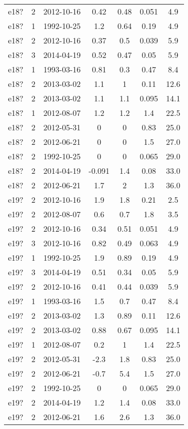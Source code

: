 \begin{table*}[htp]
\begin{tabular}{ccccccc}
e18? & 2 & 2012-10-16 & 0.42 & 0.48 & 0.051 & 4.9 \\
e18? & 1 & 1992-10-25 & 1.2 & 0.64 & 0.19 & 4.9 \\
e18? & 2 & 2012-10-16 & 0.37 & 0.5 & 0.039 & 5.9 \\
e18? & 3 & 2014-04-19 & 0.52 & 0.47 & 0.05 & 5.9 \\
e18? & 1 & 1993-03-16 & 0.81 & 0.3 & 0.47 & 8.4 \\
e18? & 2 & 2013-03-02 & 1.1 & 1 & 0.11 & 12.6 \\
e18? & 2 & 2013-03-02 & 1.1 & 1.1 & 0.095 & 14.1 \\
e18? & 1 & 2012-08-07 & 1.2 & 1.2 & 1.4 & 22.5 \\
e18? & 2 & 2012-05-31 & 0 & 0 & 0.83 & 25.0 \\
e18? & 2 & 2012-06-21 & 0 & 0 & 1.5 & 27.0 \\
e18? & 2 & 1992-10-25 & 0 & 0 & 0.065 & 29.0 \\
e18? & 2 & 2014-04-19 & -0.091 & 1.4 & 0.08 & 33.0 \\
e18? & 2 & 2012-06-21 & 1.7 & 2 & 1.3 & 36.0 \\
e19? & 2 & 2012-10-16 & 1.9 & 1.8 & 0.21 & 2.5 \\
e19? & 2 & 2012-08-07 & 0.6 & 0.7 & 1.8 & 3.5 \\
e19? & 2 & 2012-10-16 & 0.34 & 0.51 & 0.051 & 4.9 \\
e19? & 3 & 2012-10-16 & 0.82 & 0.49 & 0.063 & 4.9 \\
e19? & 1 & 1992-10-25 & 1.9 & 0.89 & 0.19 & 4.9 \\
e19? & 3 & 2014-04-19 & 0.51 & 0.34 & 0.05 & 5.9 \\
e19? & 2 & 2012-10-16 & 0.41 & 0.44 & 0.039 & 5.9 \\
e19? & 1 & 1993-03-16 & 1.5 & 0.7 & 0.47 & 8.4 \\
e19? & 2 & 2013-03-02 & 1.3 & 0.89 & 0.11 & 12.6 \\
e19? & 2 & 2013-03-02 & 0.88 & 0.67 & 0.095 & 14.1 \\
e19? & 1 & 2012-08-07 & 0.2 & 1 & 1.4 & 22.5 \\
e19? & 2 & 2012-05-31 & -2.3 & 1.8 & 0.83 & 25.0 \\
e19? & 2 & 2012-06-21 & -0.7 & 5.4 & 1.5 & 27.0 \\
e19? & 2 & 1992-10-25 & 0 & 0 & 0.065 & 29.0 \\
e19? & 2 & 2014-04-19 & 1.2 & 1.4 & 0.08 & 33.0 \\
e19? & 2 & 2012-06-21 & 1.6 & 2.6 & 1.3 & 36.0 \\

\end{tabular}
\end{table*}
